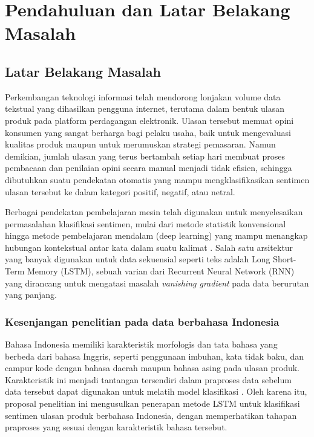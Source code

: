 
\chapter{Pendahuluan dan Latar Belakang Masalah}

\section{Latar Belakang Masalah}
Perkembangan teknologi informasi telah mendorong lonjakan volume data
tekstual yang dihasilkan pengguna internet, terutama dalam bentuk
ulasan produk pada platform perdagangan elektronik. Ulasan tersebut
memuat opini konsumen yang sangat berharga bagi pelaku usaha, baik
untuk mengevaluasi kualitas produk maupun untuk merumuskan strategi
pemasaran. Namun demikian, jumlah ulasan yang terus bertambah setiap
hari membuat proses pembacaan dan penilaian opini secara manual
menjadi tidak efisien, sehingga dibutuhkan suatu pendekatan otomatis
yang mampu mengklasifikasikan sentimen ulasan tersebut ke dalam
kategori positif, negatif, atau netral.

Berbagai pendekatan pembelajaran mesin telah digunakan untuk
menyelesaikan permasalahan klasifikasi sentimen, mulai dari metode
statistik konvensional hingga metode pembelajaran mendalam (deep
learning) yang mampu menangkap hubungan kontekstual antar kata dalam
suatu kalimat \citep{example2022}. Salah satu arsitektur yang banyak
digunakan untuk data sekuensial seperti teks adalah Long Short-Term
Memory (LSTM), sebuah varian dari Recurrent Neural Network (RNN) yang
dirancang untuk mengatasi masalah \textit{vanishing gradient} pada
data berurutan yang panjang.

\subsection{Kesenjangan penelitian pada data berbahasa Indonesia}
Bahasa Indonesia memiliki karakteristik morfologis dan tata bahasa
yang berbeda dari bahasa Inggris, seperti penggunaan imbuhan, kata
tidak baku, dan campur kode dengan bahasa daerah maupun bahasa asing
pada ulasan produk. Karakteristik ini menjadi tantangan tersendiri
dalam praproses data sebelum data tersebut dapat digunakan untuk
melatih model klasifikasi \citep{example2023}. Oleh karena itu,
proposal penelitian ini mengusulkan penerapan metode LSTM untuk
klasifikasi sentimen ulasan produk berbahasa Indonesia, dengan
memperhatikan tahapan praproses yang sesuai dengan karakteristik
bahasa tersebut.

